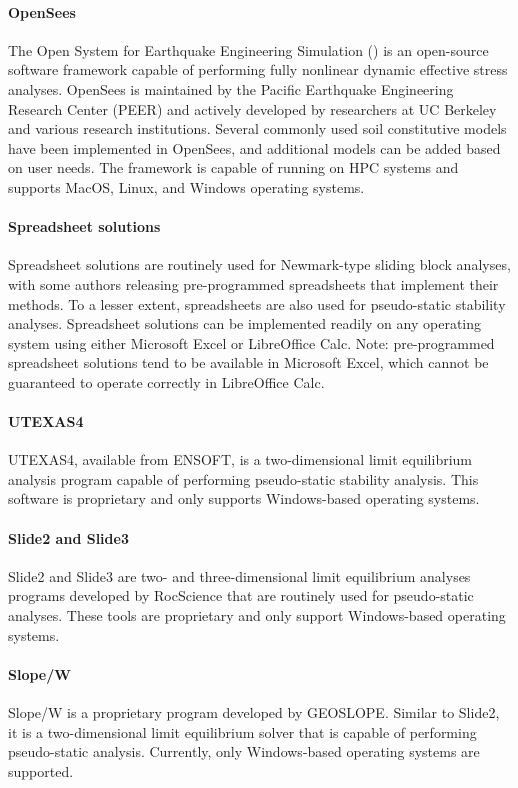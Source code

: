\paragraph{OpenSees}
The Open System for Earthquake Engineering Simulation () is an open-source software framework capable of performing fully nonlinear dynamic effective stress analyses. OpenSees is maintained by the Pacific Earthquake Engineering Research Center (PEER) and actively developed by researchers at UC Berkeley and various research institutions. Several commonly used soil constitutive models have been implemented in OpenSees, and additional models can be added based on user needs. The framework is capable of running on HPC systems and supports MacOS, Linux, and Windows operating systems.

\paragraph{Spreadsheet solutions}
Spreadsheet solutions are routinely used for Newmark-type sliding block analyses, with some authors releasing pre-programmed spreadsheets that implement their methods. To a lesser extent, spreadsheets are also used for pseudo-static stability analyses. Spreadsheet solutions can be implemented readily on any operating system using either Microsoft Excel or LibreOffice Calc. Note:  pre-programmed spreadsheet solutions tend to be available in Microsoft Excel, which cannot be guaranteed to operate correctly in LibreOffice Calc.

\paragraph{UTEXAS4}
UTEXAS4, available from ENSOFT, is a two-dimensional limit equilibrium analysis program capable of performing pseudo-static stability analysis. This software is proprietary and only supports Windows-based operating systems.

\paragraph{Slide2 and Slide3}
Slide2 and Slide3 are two- and three-dimensional limit equilibrium analyses programs developed by RocScience that are routinely used for pseudo-static analyses. These tools are proprietary and only support Windows-based operating systems.

\paragraph{Slope/W}
Slope/W is a proprietary program developed by GEOSLOPE. Similar to Slide2, it is a two-dimensional limit equilibrium solver that is capable of performing pseudo-static analysis. Currently, only Windows-based operating systems are supported.

